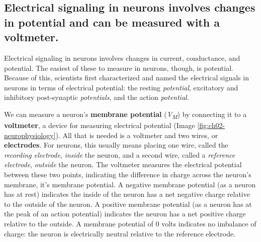 \documentclass[
]{book}
\begin{document}
\hypertarget{electrical-signaling-in-neurons-involves-changes-in-potential-and-can-be-measured-with-a-voltmeter.}{%
\subsection{Electrical signaling in neurons involves changes in potential and can be measured with a voltmeter.}\label{electrical-signaling-in-neurons-involves-changes-in-potential-and-can-be-measured-with-a-voltmeter.}}

Electrical signaling in neurons involves changes in current, conductance, and potential. The easiest of these to measure in neurons, though, is potential. Because of this, scientists first characterized and named the electrical signals in neurons in terms of electrical potential: the resting \emph{potential}, excitatory and inhibitory post-synaptic \emph{potentials}, and the action \emph{potential}.

We can measure a neuron's \textbf{membrane potential} (\emph{V\textsubscript{M}}) by connecting it to a \textbf{voltmeter}, a device for measuring electrical potential (Image \ref{fig:ch02-neurophysiology}). All that is needed is a voltmeter and two wires, or \textbf{electrodes}. For neurons, this usually means placing one wire, called the \emph{recording electrode}, \emph{inside} the neuron, and a second wire, called a \emph{reference electrode}, \emph{outside} the neuron. The voltmeter measures the electrical potential between these two points, indicating the difference in charge across the neuron's membrane, it's membrane potential. A negative membrane potential (as a neuron has at rest) indicates the inside of the neuron has a net negative charge relative to the outside of the neuron. A positive membrane potential (as a neuron has at the peak of an action potential) indicates the neuron has a net positive charge relative to the outside. A membrane potential of 0 volts indicates no imbalance of charge: the neuron is electrically neutral relative to the reference electrode.
\end{document}
